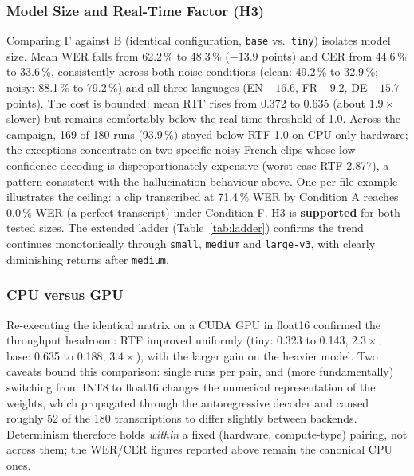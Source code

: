 \documentclass[12pt]{report}
\begin{document}
\subsubsection{Model Size and Real-Time Factor (H3)}
Comparing F against B (identical configuration, \texttt{base} vs.\ \texttt{tiny}) isolates model size. Mean WER falls from 62.2\,\% to 48.3\,\% ($-13.9$ points) and CER from 44.6\,\% to 33.6\,\%, consistently across both noise conditions (clean: 49.2\,\% to 32.9\,\%; noisy: 88.1\,\% to 79.2\,\%) and all three languages (EN $-16.6$, FR $-9.2$, DE $-15.7$ points). The cost is bounded: mean RTF rises from 0.372 to 0.635 (about $1.9\times$ slower) but remains comfortably below the real-time threshold of 1.0. Across the campaign, 169 of 180 runs (93.9\,\%) stayed below RTF 1.0 on CPU-only hardware; the exceptions concentrate on two specific noisy French clips whose low-confidence decoding is disproportionately expensive (worst case RTF 2.877), a pattern consistent with the hallucination behaviour above. One per-file example illustrates the ceiling: a clip transcribed at 71.4\,\% WER by Condition A reaches 0.0\,\% WER (a perfect transcript) under Condition F. H3 is \textbf{supported} for both tested sizes. The extended ladder (Table~\ref{tab:ladder}) confirms the trend continues monotonically through \texttt{small}, \texttt{medium} and \texttt{large-v3}, with clearly diminishing returns after \texttt{medium}.
\subsubsection{CPU versus GPU}
Re-executing the identical matrix on a CUDA GPU in float16 confirmed the throughput headroom: RTF improved uniformly (tiny: 0.323 to 0.143, $2.3\times$; base: 0.635 to 0.188, $3.4\times$), with the larger gain on the heavier model. Two caveats bound this comparison: single runs per pair, and (more fundamentally) switching from INT8 to float16 changes the numerical representation of the weights, which propagated through the autoregressive decoder and caused roughly 52 of the 180 transcriptions to differ slightly between backends. Determinism therefore holds \emph{within} a fixed (hardware, compute-type) pairing, not across them; the WER/CER figures reported above remain the canonical CPU ones.
\end{document}
